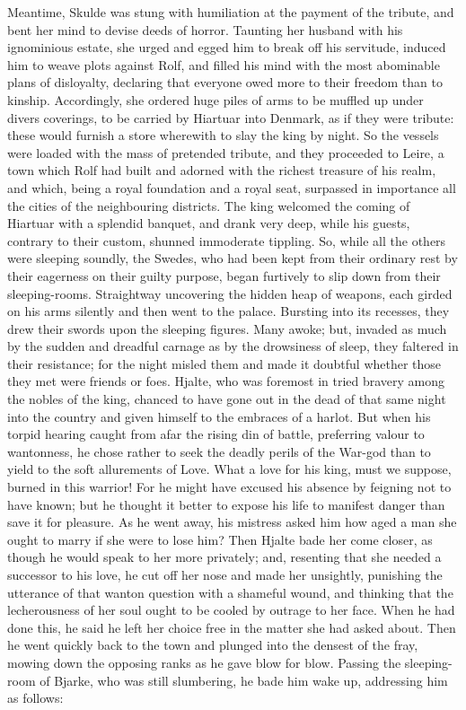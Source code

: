 \documentclass[10pt,a4paper]{report}
\begin{document}
Meantime, Skulde was stung with humiliation at the payment of the tribute, and bent her mind to devise deeds of horror. Taunting her husband with his ignominious estate, she urged and egged him to break off his servitude, induced him to weave plots against Rolf, and filled his mind with the most abominable plans of disloyalty, declaring that everyone owed more to their freedom than to kinship. Accordingly, she ordered huge piles of arms to be muffled up under divers coverings, to be carried by Hiartuar into Denmark, as if they were tribute: these would furnish a store wherewith to slay the king by night. So the vessels were loaded with the mass of pretended tribute, and they proceeded to Leire, a town which Rolf had built and adorned with the richest treasure of his realm, and which, being a royal foundation and a royal seat, surpassed in importance all the cities of the neighbouring districts. The king welcomed the coming of Hiartuar with a splendid banquet, and drank very deep, while his guests, contrary to their custom, shunned immoderate tippling. So, while all the others were sleeping soundly, the Swedes, who had been kept from their ordinary rest by their eagerness on their guilty purpose, began furtively to slip down from their sleeping-rooms. Straightway uncovering the hidden heap of weapons, each girded on his arms silently and then went to the palace. Bursting into its recesses, they drew their swords upon the sleeping figures. Many awoke; but, invaded as much by the sudden and dreadful carnage as by the drowsiness of sleep, they faltered in their resistance; for the night misled them and made it doubtful whether those they met were friends or foes. Hjalte, who was foremost in tried bravery among the nobles of the king, chanced to have gone out in the dead of that same night into the country and given himself to the embraces of a harlot. But when his torpid hearing caught from afar the rising din of battle, preferring valour to wantonness, he chose rather to seek the deadly perils of the War-god than to yield to the soft allurements of Love. What a love for his king, must we suppose, burned in this warrior! For he might have excused his absence by feigning not to have known; but he thought it better to expose his life to manifest danger than save it for pleasure. As he went away, his mistress asked him how aged a man she ought to marry if she were to lose him? Then Hjalte bade her come closer, as though he would speak to her more privately; and, resenting that she needed a successor to his love, he cut off her nose and made her unsightly, punishing the utterance of that wanton question with a shameful wound, and thinking that the lecherousness of her soul ought to be cooled by outrage to her face. When he had done this, he said he left her choice free in the matter she had asked about. Then he went quickly back to the town and plunged into the densest of the fray, mowing down the opposing ranks as he gave blow for blow. Passing the sleeping-room of Bjarke, who was still slumbering, he bade him wake up, addressing him as follows:\\
\end{document}
